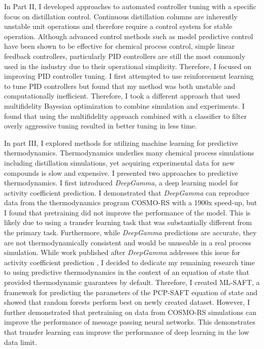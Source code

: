 In Part II, I developed approaches to automated controller tuning with a specific focus on distillation control. Continuous distillation columns are inherently unstable unit operations and therefore require a control system for stable operation. Although advanced control methods such as model predictive control have been shown to be effective for chemical process control, simple linear feedback controllers, particularly PID controllers are still the most commonly used in the industry due to their operational simplicity. Therefore, I focused on improving PID controller tuning. I first attempted to use reinforcement learning to tune PID controllers but found that my method was both unstable and computationally inefficient. Therefore, I took a different approach that used multifidelity Bayesian optimization to combine simulation and experiments.  I found that using the multifidelity approach combined with a classifier to filter overly aggressive tuning resulted in better tuning in less time.


In part III, I explored methods for utilizing machine learning for predictive thermodynamics. Thermodynamics underlies many chemical process simulations including distillation simulations, yet acquiring experimental  data for new compounds is slow and expensive. I presented two approaches to predictive thermodynamics.  I first introduced \textit{DeepGamma}, a deep learning model for activity coefficient prediction. I demonstrated that \textit{DeepGamma} can reproduce data from the thermodynamics program COSMO-RS with a 1900x speed-up, but I found that pretraining  did not improve the performance of the model. This is likely due to using a transfer learning task that was substantially different from the primary task. Furthermore, while \textit{DeepGamma} predictions are accurate, they are not thermodynamically consistent and would be unuseable in a real process simulation. While work published after \textit{DeepGamma} addresses this issue for activity coefficient prediction \cite{Winter2022, SanchezMedina2023}, I decided to dedicate my remaining research time to using predictive thermodynamics in the context of an equation of state that provided thermodynamic guarantees by default. Therefore, I created ML-SAFT, a framework for predicting the parameters of the PCP-SAFT equation of state and showed that random forests perform best on newly created dataset. However, I further demonstrated that pretraining on data from COSMO-RS simulations can improve the performance of message passing neural networks. This demonstrates that transfer learning can improve the performance of deep learning in the low data limit.

